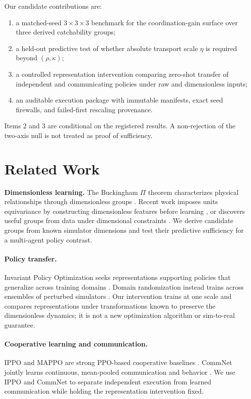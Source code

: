 \documentclass{article}
\newcommand{\rhoSNR}{\rho}
\newcommand{\kappaC}{\kappa}
\newcommand{\etaT}{\eta}
\begin{document}
Our candidate contributions are:
\begin{enumerate}
  \item a matched-seed $3\times3\times3$ benchmark for the coordination-gain
  surface over three derived catchability groups;
  \item a held-out predictive test of whether absolute transport scale $\etaT$
  is required beyond $(\rhoSNR,\kappaC)$;
  \item a controlled representation intervention comparing zero-shot transfer
  of independent and communicating policies under raw and dimensionless inputs;
  \item an auditable execution package with immutable manifests, exact seed
  firewalls, and failed-first rescaling provenance.
\end{enumerate}

Items 2 and 3 are conditional on the registered results. A non-rejection of the
two-axis null is not treated as proof of sufficiency.

\section{Related Work}

\noindent\textbf{Dimensionless learning.}
The Buckingham $\Pi$ theorem characterizes physical relationships through
dimensionless groups \citep{buckingham1914}. Recent work imposes units
equivariance by constructing dimensionless features before learning
\citep{villar2023dimensionless}, or discovers useful groups from data under
dimensional constraints \citep{bakarji2022buckingham}. We derive candidate
groups from known simulator dimensions and test their predictive sufficiency
for a multi-agent policy contrast.

\paragraph{Policy transfer.}
Invariant Policy Optimization seeks representations supporting policies that
generalize across training domains \citep{sonar2021invariant}. Domain
randomization instead trains across ensembles of perturbed simulators
\citep{muratore2018domain}. Our intervention trains at one scale and compares
representations under transformations known to preserve the dimensionless
dynamics; it is not a new optimization algorithm or sim-to-real guarantee.

\paragraph{Cooperative learning and communication.}
IPPO and MAPPO are strong PPO-based cooperative baselines
\citep{yu2022surprising}. CommNet jointly learns continuous, mean-pooled
communication and behavior \citep{sukhbaatar2016commnet}. We use IPPO and
CommNet to separate independent execution from learned communication while
holding the representation intervention fixed.
\end{document}
